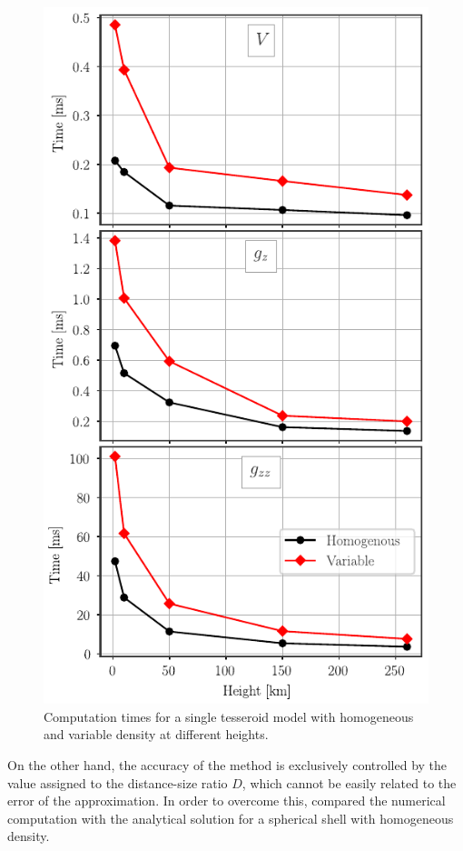 \documentclass[extra]{gji}
\begin{document}
\begin{figure}
\centering
\includegraphics[width=0.9\linewidth]{figures/speed-comparison.pdf}
\caption{Computation times for a single tesseroid model with homogeneous and variable density at different heights.}
\label{fig:speed-comparison}
\end{figure}

On the other hand, the accuracy of the method is exclusively controlled by the value assigned to the distance-size ratio $D$, which cannot be easily related to the error of the approximation.
In order to overcome this, \citet{Uieda2016} compared the numerical computation with the analytical solution for a spherical shell with homogeneous density.
\end{document}
